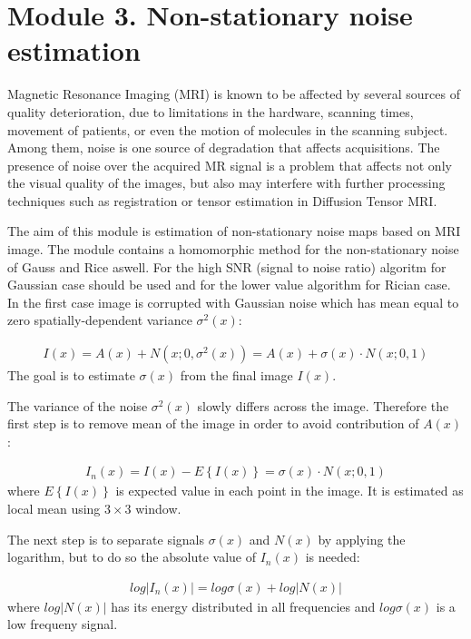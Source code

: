 \section{Module 3. Non-stationary noise estimation}

Magnetic Resonance Imaging (MRI) is known to be affected by several
sources of quality deterioration, due to limitations in the hardware,
scanning times, movement of patients, or even the motion of molecules
in the scanning subject. Among them, noise is one source of degradation
that affects acquisitions. The presence of noise over the acquired
MR signal is a problem that affects not only the visual quality of
the images, but also may interfere with further processing techniques
such as registration or tensor estimation in Diffusion Tensor MRI.

The aim of this module is estimation of non-stationary noise maps based on MRI image. The module
contains a homomorphic method for the non-stationary noise of Gauss and Rice aswell. For the high SNR (signal to noise ratio) algoritm for Gaussian case should be used and for the lower value algorithm for Rician case. In the first case image is corrupted
with Gaussian noise which has mean equal to zero spatially-dependent variance $\sigma^{2}(x)$:

\begin{equation}
\begin{aligned}I(x)=A(x)+N(x;0,\sigma^{2}(x))=A(x)+\sigma(x)\cdot N(x;0,1)\end{aligned}
\end{equation}
The goal is to estimate $\sigma(x)$ from the final image $I(x)$.

The variance of the noise $\sigma^{2}(x)$ slowly differs across the image. Therefore the first step is to remove
mean of the image in order to avoid contribution of $A(x)$:

\begin{equation}
\begin{aligned}I_{n}(x)=I(x)-E\left \{ I(x) \right \}=\sigma(x)\cdot N(x;0,1)\end{aligned}
\end{equation}
where $E\left \{ I(x) \right \}$ is expected value in each point in the image. It is estimated as local mean using $3\times3$
window.

The next step is to separate signals $\sigma(x)$ and $N(x)$ by applying the logarithm, but to do so the absolute value of $I_{n}(x)$ is needed:

\begin{equation}
\begin{aligned}log\left |  I_{n}(x)\right |=log\sigma(x)+log\left | N(x) \right |\end{aligned}
\end{equation}
where $log\left | N(x) \right |$ has its energy distributed in all frequencies and $log\sigma(x)$ is a low frequeny signal.

